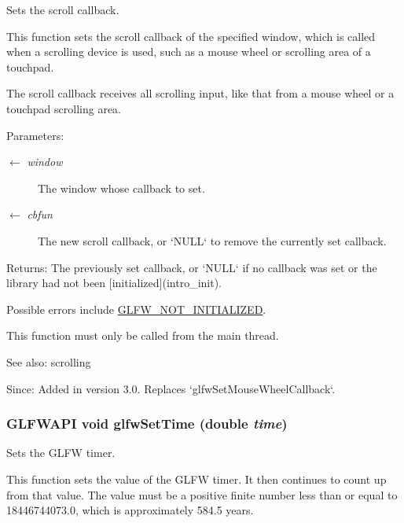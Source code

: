 Sets the scroll callback. 

This function sets the scroll callback of the specified window, which is called when a scrolling device is used, such as a mouse wheel or scrolling area of a touchpad.

The scroll callback receives all scrolling input, like that from a mouse wheel or a touchpad scrolling area.

\begin{Desc}
\item[Parameters:]
\begin{description}
\item[\mbox{$\leftarrow$} {\em window}]The window whose callback to set. \item[\mbox{$\leftarrow$} {\em cbfun}]The new scroll callback, or `NULL` to remove the currently set callback. \end{description}
\end{Desc}
\begin{Desc}
\item[Returns:]The previously set callback, or `NULL` if no callback was set or the library had not been \mbox{[}initialized\mbox{]}(intro\_\-init).\end{Desc}
Possible errors include \hyperlink{group__errors_g2374ee02c177f12e1fa76ff3ed15e14a}{GLFW\_\-NOT\_\-INITIALIZED}.

This function must only be called from the main thread.

\begin{Desc}
\item[See also:]scrolling\end{Desc}
\begin{Desc}
\item[Since:]Added in version 3.0. Replaces `glfwSetMouseWheelCallback`. \end{Desc}
\hypertarget{group__input_g94360a3628a09f32708f83cc3fa48590}{
\subsubsection[glfwSetTime]{\setlength{\rightskip}{0pt plus 5cm}GLFWAPI void glfwSetTime (double {\em time})}}
\label{group__input_g94360a3628a09f32708f83cc3fa48590}


Sets the GLFW timer. 

This function sets the value of the GLFW timer. It then continues to count up from that value. The value must be a positive finite number less than or equal to 18446744073.0, which is approximately 584.5 years.

